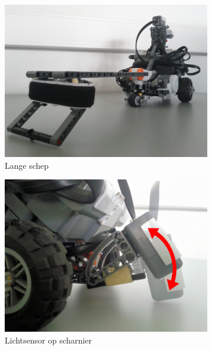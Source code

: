 \documentclass[eind]{penoverslag}
\begin{document}
\begin{figure}
\centering
	\begin{subfigure}[h]{0.325\textwidth}
	\centering
		\includegraphics[width=\textwidth]{robotSchep}
		\caption{Lange schep}
	\end{subfigure}
	\begin{subfigure}[h]{0.325\textwidth}
		\centering
		\includegraphics[width=\textwidth]{robotLicht}
		\caption{Lichtsensor op scharnier}
	\end{subfigure}
	\begin{subfigure}[h]{0.325\textwidth}
		\centering

\end{subfigure}
\end{figure}
\end{document}
